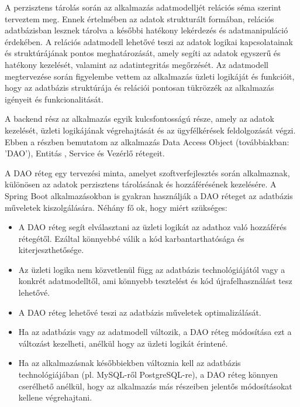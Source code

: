 A perzisztens tárolás során az alkalmazás adatmodelljét relációs séma szerint terveztem meg. Ennek értelmében az adatok strukturált formában, relációs adatbázisban lesznek tárolva a későbbi hatékony lekérdezés és adatmanipuláció érdekében. A relációs adatmodell lehetővé teszi az adatok logikai kapcsolatainak és struktúrájának pontos meghatározását, amely segíti az adatok egyszerű és hatékony kezelését, valamint az adatintegritás megőrzését. Az adatmodell megtervezése során figyelembe vettem az alkalmazás üzleti logikáját és funkcióit, hogy az adatbázis struktúrája és relációi pontosan tükrözzék az alkalmazás igényeit és funkcionalitását.


A backend rész az alkalmazás egyik kulcsfontosságú része, amely az adatok kezelését, üzleti logikájának végrehajtását és az ügyfélkérések feldolgozását végzi. Ebben a részben bemutatom az alkalmazás Data Access Object (továbbiakban: 'DAO'), Entitás , Service és Vezérlő rétegeit.


A DAO\cite{DAO} réteg egy tervezési minta, amelyet szoftverfejlesztés során alkalmaznak, különösen az adatok perzisztens tárolásának és hozzáférésének kezelésére. A Spring Boot\cite{spring_boot} alkalmazásokban is gyakran használják a DAO\cite{DAO} réteget az adatbázis műveletek kiszolgálására. Néhány fő ok, hogy miért szükséges:

\begin{itemize}

\item{} A DAO\cite{DAO} réteg segít elválasztani az üzleti logikát az adathoz való hozzáférés rétegétől. Ezáltal könnyebbé válik a kód karbantarthatósága és kiterjeszthetősége. 

\item{} Az üzleti logika nem közvetlenül függ az adatbázis technológiájától vagy a konkrét adatmodelltől, ami könnyebb tesztelést és kód újrafelhasználást tesz lehetővé. 

\item{} A DAO\cite{DAO} réteg lehetővé teszi az adatbázis műveletek optimalizálását. 

\item{} Ha az adatbázis vagy az adatmodell változik, a DAO\cite{DAO} réteg módosítása ezt a változást kezelheti, anélkül hogy az üzleti logikát érintené. 

\item{} Ha az alkalmazásnak későbbiekben változnia kell az adatbázis technológiájában (pl. MySQL-ről PostgreSQL-re), a DAO\cite{DAO} réteg könnyen cserélhető anélkül, hogy az alkalmazás más részeiben jelentős módosításokat kellene végrehajtani.

\end{itemize}

